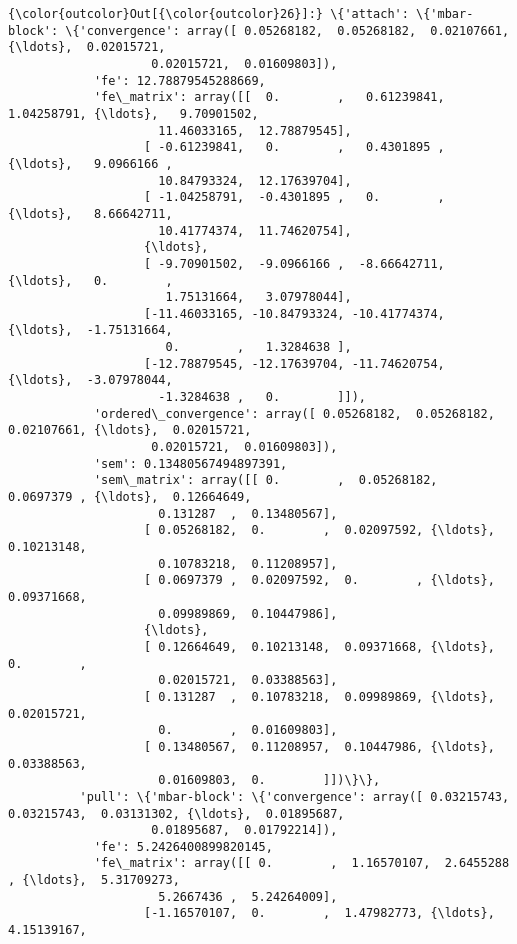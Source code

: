 \documentclass[11pt]{article}
\begin{document}
\begin{Verbatim}[commandchars=\\\{\}]
{\color{outcolor}Out[{\color{outcolor}26}]:} \{'attach': \{'mbar-block': \{'convergence': array([ 0.05268182,  0.05268182,  0.02107661, {\ldots},  0.02015721,
                    0.02015721,  0.01609803]),
            'fe': 12.78879545288669,
            'fe\_matrix': array([[  0.        ,   0.61239841,   1.04258791, {\ldots},   9.70901502,
                     11.46033165,  12.78879545],
                   [ -0.61239841,   0.        ,   0.4301895 , {\ldots},   9.0966166 ,
                     10.84793324,  12.17639704],
                   [ -1.04258791,  -0.4301895 ,   0.        , {\ldots},   8.66642711,
                     10.41774374,  11.74620754],
                   {\ldots}, 
                   [ -9.70901502,  -9.0966166 ,  -8.66642711, {\ldots},   0.        ,
                      1.75131664,   3.07978044],
                   [-11.46033165, -10.84793324, -10.41774374, {\ldots},  -1.75131664,
                      0.        ,   1.3284638 ],
                   [-12.78879545, -12.17639704, -11.74620754, {\ldots},  -3.07978044,
                     -1.3284638 ,   0.        ]]),
            'ordered\_convergence': array([ 0.05268182,  0.05268182,  0.02107661, {\ldots},  0.02015721,
                    0.02015721,  0.01609803]),
            'sem': 0.13480567494897391,
            'sem\_matrix': array([[ 0.        ,  0.05268182,  0.0697379 , {\ldots},  0.12664649,
                     0.131287  ,  0.13480567],
                   [ 0.05268182,  0.        ,  0.02097592, {\ldots},  0.10213148,
                     0.10783218,  0.11208957],
                   [ 0.0697379 ,  0.02097592,  0.        , {\ldots},  0.09371668,
                     0.09989869,  0.10447986],
                   {\ldots}, 
                   [ 0.12664649,  0.10213148,  0.09371668, {\ldots},  0.        ,
                     0.02015721,  0.03388563],
                   [ 0.131287  ,  0.10783218,  0.09989869, {\ldots},  0.02015721,
                     0.        ,  0.01609803],
                   [ 0.13480567,  0.11208957,  0.10447986, {\ldots},  0.03388563,
                     0.01609803,  0.        ]])\}\},
          'pull': \{'mbar-block': \{'convergence': array([ 0.03215743,  0.03215743,  0.03131302, {\ldots},  0.01895687,
                    0.01895687,  0.01792214]),
            'fe': 5.2426400899820145,
            'fe\_matrix': array([[ 0.        ,  1.16570107,  2.6455288 , {\ldots},  5.31709273,
                     5.2667436 ,  5.24264009],
                   [-1.16570107,  0.        ,  1.47982773, {\ldots},  4.15139167,

\end{Verbatim}
\end{document}
